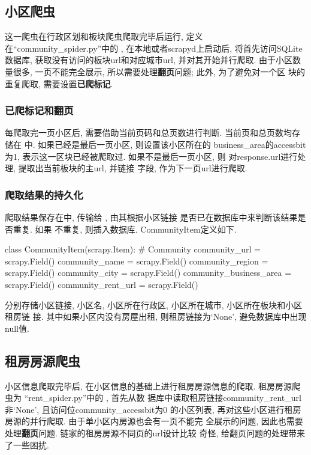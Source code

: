\subsection{小区爬虫}
这一爬虫在行政区划和板块爬虫爬取完毕后运行, 定义在``community\_spider.py''中的
, 在本地或者scrapyd上启动后,
将首先访问SQLite数据库, 获取没有访问的板块url和对应城市url, 并对其开始并行爬取.
由于小区数量很多, 一页不能完全展示, 所以需要处理\textbf{翻页}问题; 此外, 为了避免对一个区
块的重复爬取, 需要设置\textbf{已爬标记}.

\subsubsection{已爬标记和翻页}
每爬取完一页小区后, 需要借助当前页码和总页数进行判断. 当前页和总页数均存储在
 中. 如果已经是最后一页小区, 则设置该小区所在的
business\_area的accessbit为1, 表示这一区块已经被爬取过. 如果不是最后一页小区, 则
对response.url进行处理, 提取出当前板块的主url, 并链接
字段, 作为下一页url进行爬取.

\subsubsection{爬取结果的持久化}
爬取结果保存在中, 传输给
, 由其根据小区链接
 是否已在数据库中来判断该结果是否重复. 如果
不重复, 则插入数据库. CommunityItem定义如下.
\begin{python}
    class CommunityItem(scrapy.Item):
    # Community
    community_url = scrapy.Field()
    community_name = scrapy.Field()
    community_region = scrapy.Field()
    community_city = scrapy.Field()
    community_business_area = scrapy.Field()
    community_rent_url = scrapy.Field()
\end{python}
分别存储小区链接, 小区名, 小区所在行政区, 小区所在城市, 小区所在板块和小区租房链
接. 其中如果小区内没有房屋出租, 则租房链接为`None', 避免数据库中出现null值.

\subsection{租房房源爬虫}
小区信息爬取完毕后, 在小区信息的基础上进行租房房源信息的爬取. 租房房源爬虫为
``rent\_spider.py''中的 , 首先从数
据库中读取租房链接community\_rent\_url非`None', 且访问位community\_accessbit为0
的小区列表, 再对这些小区进行租房房源的并行爬取. 由于单小区内房源也会有一页不能完
全展示的问题, 因此也需要处理\textbf{翻页}问题. 链家的租房房源不同页的url设计比较
奇怪, 给翻页问题的处理带来了一些困扰.

